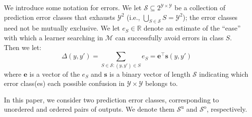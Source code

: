 \documentclass{article} %
\newcommand{\unorderedS}{\mathcal{S}^{\mathrm{u}}}
\newcommand{\orderedS}{\mathcal{S}^{\mathrm{o}}}
\begin{document}
We introduce some notation for errors.
We let $\mathcal{S} \subseteq 2^{\mathcal{Y}\times\mathcal{Y}}$ be a
collection of prediction error classes that 
exhausts $\mathcal{Y}^2$ (i.e., $\bigcup_{S \in
  \mathcal{S}} S = \mathcal{Y}^2$); the error 
  classes need not be
mutually exclusive.  We let $e_{S} \in \mathbb{R}$ denote an estimate
of the ``ease'' with which a learner searching in $\mathcal{M}$ 
can successfully avoid errors in class $S$.  Then we let:
\begin{equation}
\Delta(y, y') = \sum_{S \in \mathcal{S}: (y, y') \in S} e_S =
\mathbf{e}^\top \mathbf{s}(y, y')
\end{equation}
where $\mathbf{e}$ is a vector of the $e_S$ and $\mathbf{s}$ is a
binary vector of length $\mathcal{S}$ indicating which error class(es)
each possible confusion in $\mathcal{Y}\times\mathcal{Y}$ belongs to.

In this paper, we consider two prediction error classes, corresponding
to unordered and ordered pairs of outputs.  We denote them
$\unorderedS$ and $\orderedS$, respectively.  




\end{document}
